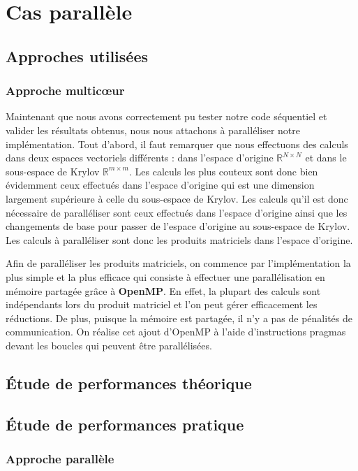 \documentclass[11pt,a4paper]{article}
\begin{document}
\section{Cas parallèle}
	\subsection{Approches utilisées}

	\subsubsection{Approche multic\oe{}ur}

		Maintenant que nous avons correctement pu tester notre code séquentiel et valider les résultats obtenus, nous nous attachons à paralléliser notre implémentation. Tout d'abord, il faut remarquer que nous effectuons des calculs dans deux espaces vectoriels différents : dans l'espace d'origine $\mathbb{R}^{N\times N}$ et dans le sous-espace de Krylov $\mathbb{R}^{m\times m}$. Les calculs les plus couteux sont donc bien évidemment ceux effectués dans l'espace d'origine qui est une dimension largement supérieure à celle du sous-espace de Krylov. Les calculs qu'il est donc nécessaire de paralléliser sont ceux effectués dans l'espace d'origine ainsi que les changements de base pour passer de l'espace d'origine au sous-espace de Krylov. Les calculs à paralléliser sont donc les produits matriciels dans l'espace d'origine.

		Afin de paralléliser les produits matriciels, on commence par l'implémentation la plus simple et la plus efficace qui consiste à effectuer une parallélisation en mémoire partagée grâce à \textbf{OpenMP}. En effet, la plupart des calculs sont indépendants lors du produit matriciel et l'on peut gérer efficacement les réductions. De plus, puisque la mémoire est partagée, il n'y a pas de pénalités de communication. On réalise cet ajout d'OpenMP à l'aide d'instructions pragmas devant les boucles qui peuvent être parallélisées.
		
		

	\subsection{Étude de performances théorique}
	\subsection{Étude de performances pratique}

		\subsubsection{Approche parallèle}
		
\end{document}
